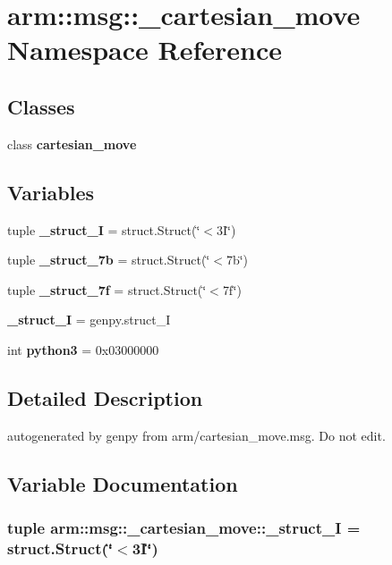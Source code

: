 \section{arm\-:\-:msg\-:\-:\-\_\-cartesian\-\_\-move \-Namespace \-Reference}
\label{namespacearm_1_1msg_1_1__cartesian__move}
\subsection*{\-Classes}
\begin{DoxyCompactItemize}
\item 
class {\bf cartesian\-\_\-move}
\end{DoxyCompactItemize}
\subsection*{\-Variables}
\begin{DoxyCompactItemize}
\item 
tuple {\bf \-\_\-struct\-\_\-I} = struct.\-Struct(\char`\"{}$<$3\-I\char`\"{})
\item 
tuple {\bf \-\_\-struct\-\_\-7b} = struct.\-Struct(\char`\"{}$<$7b\char`\"{})
\item 
tuple {\bf \-\_\-struct\-\_\-7f} = struct.\-Struct(\char`\"{}$<$7f\char`\"{})
\item 
{\bf \-\_\-struct\-\_\-\-I} = genpy.\-struct\-\_\-\-I
\item 
int {\bf python3} = 0x03000000
\end{DoxyCompactItemize}


\subsection{\-Detailed \-Description}
\begin{DoxyVerb}autogenerated by genpy from arm/cartesian_move.msg. Do not edit.\end{DoxyVerb}
 

\subsection{\-Variable \-Documentation}
\subsubsection[{\-\_\-struct\-\_\-3\-I}]{\setlength{\rightskip}{0pt plus 5cm}tuple {\bf arm\-::msg\-::\-\_\-cartesian\-\_\-move\-::\-\_\-struct\-\_\-I} = struct.\-Struct(\char`\"{}$<$3\-I\char`\"{})}\label{namespacearm_1_1msg_1_1__cartesian__move_a4d9ded89ed5082796b801df8b41592bf}


